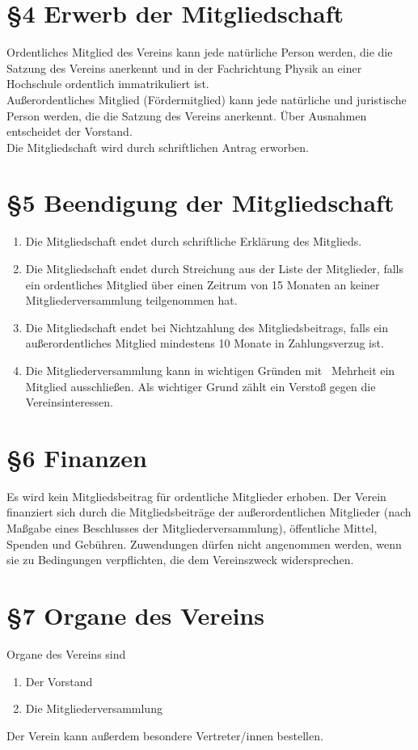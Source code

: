 \documentclass[ngerman]{article}
\begin{document}
\section*{§4 Erwerb der Mitgliedschaft}
Ordentliches Mitglied des Vereins kann jede natürliche Person werden, die die Satzung des Vereins anerkennt und in der Fachrichtung Physik an einer Hochschule ordentlich immatrikuliert ist.\\
Außerordentliches Mitglied (\glqq Fördermitglied\grqq) kann jede natürliche und juristische Person werden, die die Satzung des Vereins anerkennt.
Über Ausnahmen entscheidet der Vorstand.\\
Die Mitgliedschaft wird durch schriftlichen Antrag erworben.


\section*{§5 Beendigung der Mitgliedschaft}
\begin{enumerate}
 \item Die Mitgliedschaft endet durch schriftliche Erklärung des Mitglieds.
 \item Die Mitgliedschaft endet durch Streichung aus der Liste der Mitglieder, falls ein ordentliches Mitglied über einen Zeitrum von 15 Monaten an keiner Mitgliederversammlung teilgenommen hat.
 \item Die Mitgliedschaft endet bei Nichtzahlung des Mitgliedsbeitrags, falls ein außerordentliches Mitglied mindestens 10 Monate in Zahlungsverzug ist.
 \item Die Mitgliederversammlung kann in wichtigen Gründen mit \textthreequarters\ Mehrheit ein Mitglied ausschließen. Als wichtiger Grund zählt ein Verstoß gegen die Vereinsinteressen.
\end{enumerate}


\section*{§6 Finanzen}
Es wird kein Mitgliedsbeitrag für ordentliche Mitglieder erhoben. Der Verein finanziert sich durch die Mitgliedsbeiträge der außerordentlichen Mitglieder (nach Maßgabe eines Beschlusses der Mitgliederversammlung), öffentliche Mittel, Spenden und Gebühren. Zuwendungen dürfen nicht angenommen werden, wenn sie zu Bedingungen verpflichten, die dem Vereinszweck widersprechen.


\section*{§7 Organe des Vereins}
Organe des Vereins sind
\begin{enumerate}
 \item Der Vorstand
 \item Die Mitgliederversammlung
\end{enumerate}
Der Verein kann außerdem besondere Vertreter/innen bestellen.
\end{document}
